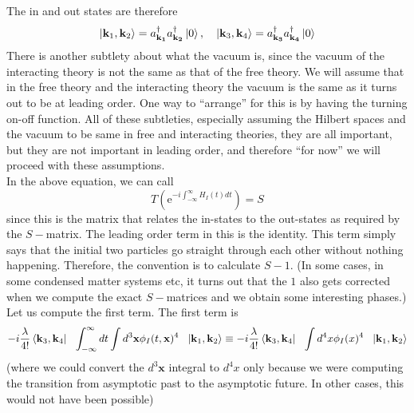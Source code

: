 \documentclass[11pt, notitlepage]{report}
\newcommand{\e}{\mathrm{e}}
\newcommand{\adag}[1]{a^\dagger_\mathbf{#1}}
\numberwithin{equation}{section}
\begin{document}
    The in and out states are therefore 
    \begin{equation*}
        \ket{\textbf{k}_1, \textbf{k}_2} = \adag{k_1}\adag{k_2}\ket{0},~~~\ket{\textbf{k}_3, \textbf{k}_4} = \adag{k_3}\adag{k_4}\ket{0}
    \end{equation*}
    There is another subtlety about what the vacuum is, since the vacuum of the interacting theory is not the same as that of the free theory. We will assume that in the free theory and the interacting theory the vacuum is the same as it turns out to be at leading order. One way to ``arrange'' for this is by having the turning on-off function. All of these subtleties, especially assuming the Hilbert spaces and the vacuum to be same in free and interacting theories, they are all important, but they are not important in leading order, and therefore ``for now'' we will proceed with these assumptions.\\

    In the above equation, we can call 
    \begin{equation*}
        T\left(\e^{-i\int_{-\infty}^{\infty}H_I(t) dt }\right) = S
    \end{equation*}
    since this is the matrix that relates the in-states to the out-states as required by the \(S-\)matrix. The leading order term in this is the identity. This term simply says that the initial two particles go straight through each other without nothing happening. Therefore, the convention is to calculate \(S-1\). (In some cases, in some condensed matter systems etc, it turns out that the \(1\) also gets corrected when we compute the exact \(S-\)matrices and we obtain some interesting phases.)\\

    Let us compute the first term. The first term is 
    \begin{equation*}
        -i\frac{\lambda}{4!} \bra{\textbf{k}_3, \textbf{k}_4} ~~\int_{-\infty}^{\infty} dt \int d^3\textbf{x} \phi_I(t, \textbf{x})^4~~ \ket{\textbf{k}_1, \textbf{k}_2} \equiv -i\frac{\lambda}{4!} \bra{\textbf{k}_3, \textbf{k}_4} ~~ \int d^4x \phi_I(x)^4~~ \ket{\textbf{k}_1, \textbf{k}_2}
    \end{equation*}
    (where we could convert the \(d^3\textbf{x}\) integral to \(d^4x\) only because we were computing the transition from asymptotic past to the asymptotic future. In other cases, this would not have been possible)\\
\end{document}

